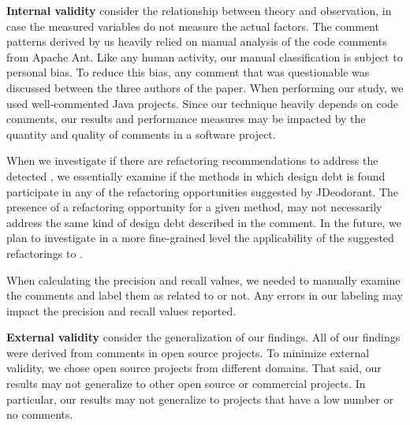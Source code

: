 \noindent\textbf{Internal validity} consider the relationship between theory and observation, in case the measured variables do not measure the actual factors. The comment patterns derived by us heavily relied on manual analysis of the code comments from Apache Ant. Like any human activity, our manual classification is subject to personal bias. To reduce this bias, any comment that was questionable was discussed between the three authors of the paper. When performing our study, we used well-commented Java projects. Since our technique heavily depends on code comments, our results and performance measures may be impacted by the quantity and quality of comments in a software project.  

When we investigate if there are refactoring recommendations to address the detected \SATD, we essentially examine if the methods in which design debt is found participate in any of the refactoring opportunities suggested by JDeodorant.
The presence of a refactoring opportunity for a given method, may not necessarily address the same kind of design debt described in the comment. In the future, we plan to investigate in a more fine-grained level the applicability of the suggested refactorings to \SATD.

When calculating the precision and recall values, we needed to manually examine the comments and label them as related to \SATD or not. Any errors in our labeling may impact the precision and recall values reported.


\noindent \textbf{External validity} consider the generalization of our findings. All of our findings were derived from comments in open source projects. To minimize external validity, we chose open source projects from different domains. That said, our results may not generalize to other open source or commercial projects. In particular, our results may not generalize to projects that have a low number or no comments.
